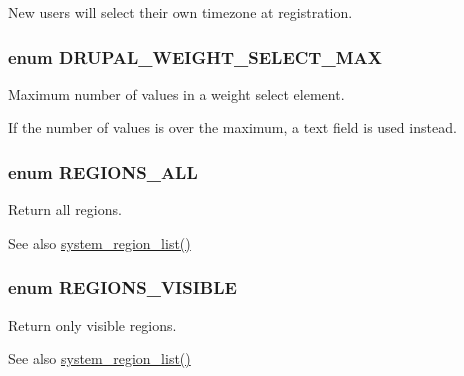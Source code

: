\label{system_8module_a7df7638d437b7a705dfdb48f46b083e2}
New users will select their own timezone at registration. \hypertarget{system_8module_af60176176a88aa633d9c3240a8fcbc62}{
\subsubsection[{DRUPAL\_\-WEIGHT\_\-SELECT\_\-MAX}]{\setlength{\rightskip}{0pt plus 5cm}enum {\bf DRUPAL\_\-WEIGHT\_\-SELECT\_\-MAX}}}
\label{system_8module_af60176176a88aa633d9c3240a8fcbc62}
Maximum number of values in a weight select element.

If the number of values is over the maximum, a text field is used instead. \hypertarget{system_8module_a39507d6bcc536ccdb523d962a7b8a5db}{
\subsubsection[{REGIONS\_\-ALL}]{\setlength{\rightskip}{0pt plus 5cm}enum {\bf REGIONS\_\-ALL}}}
\label{system_8module_a39507d6bcc536ccdb523d962a7b8a5db}
Return all regions.

\begin{DoxySeeAlso}{See also}
\hyperlink{system_8module_a83141ec3e67f121c72317be0c674dfe6}{system\_\-region\_\-list()} 
\end{DoxySeeAlso}
\hypertarget{system_8module_a270017c2fcde2d42ea4e74defd32e195}{
\subsubsection[{REGIONS\_\-VISIBLE}]{\setlength{\rightskip}{0pt plus 5cm}enum {\bf REGIONS\_\-VISIBLE}}}
\label{system_8module_a270017c2fcde2d42ea4e74defd32e195}
Return only visible regions.

\begin{DoxySeeAlso}{See also}
\hyperlink{system_8module_a83141ec3e67f121c72317be0c674dfe6}{system\_\-region\_\-list()} 
\end{DoxySeeAlso}


